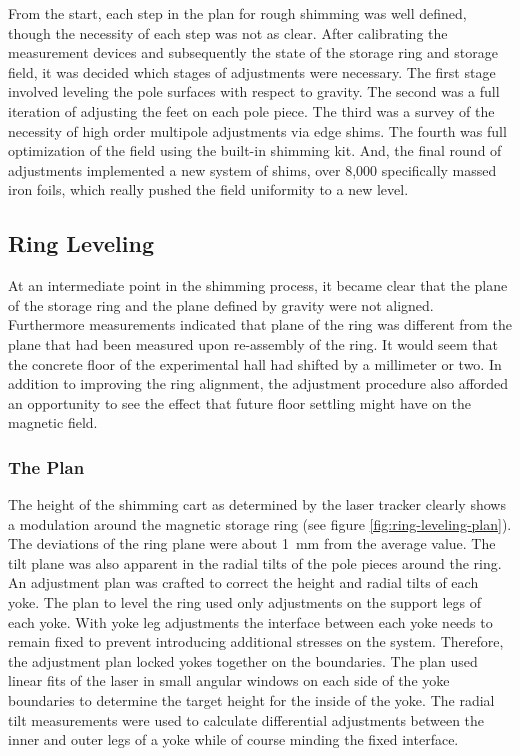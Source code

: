 From the start, each step in the plan for rough shimming was well defined, though the necessity of each step was not as clear.  After calibrating the measurement devices and subsequently the state of the storage ring and storage field, it was decided which stages of adjustments were necessary.  The first stage involved leveling the pole surfaces with respect to gravity.  The second was a full iteration of adjusting the feet on each pole piece.  The third was a survey of the necessity of high order multipole adjustments via edge shims.  The fourth was full optimization of the field using the built-in shimming kit.  And, the final round of adjustments implemented a new system of shims, over 8,000 specifically massed iron foils, which really pushed the field uniformity to a new level.

\subsection{Ring Leveling}
At an intermediate point in the shimming process, it became clear that the plane of the storage ring and the plane defined by gravity were not aligned.  Furthermore measurements indicated that plane of the ring was different from the plane that had been measured upon re-assembly of the ring.  It would seem that the concrete floor of the experimental hall had shifted by a millimeter or two.  In addition to improving the ring alignment, the adjustment procedure also afforded an opportunity to see the effect that future floor settling might have on the magnetic field.

\subsubsection{The Plan}
The height of the shimming cart as determined by the laser tracker clearly shows a modulation around the magnetic storage ring (see figure \ref{fig:ring-leveling-plan}).  The deviations of the ring plane were about \SI{1}{\milli\meter} from the average value.  The tilt plane was also apparent in the radial tilts of the pole pieces around the ring.  An adjustment plan was crafted to correct the height and radial tilts of each yoke.  The plan to level the ring used only adjustments on the support legs of each yoke. With yoke leg adjustments the interface between each yoke needs to remain fixed to prevent introducing additional stresses on the system.  Therefore, the adjustment plan locked yokes together on the boundaries.  The plan used linear fits of the laser in small angular windows on each side of the yoke boundaries to determine the target height for the inside of the yoke.  The radial tilt measurements were used to calculate differential adjustments between the inner and outer legs of a yoke while of course minding the fixed interface. 

